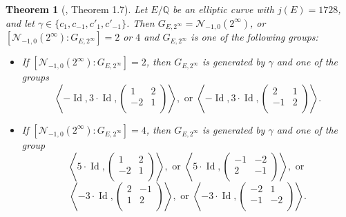 \documentclass[11pt]{amsart}
\newtheorem{thm}[defn]{Theorem}
\theoremstyle{definition}
\newcommand{\Q}{\mathbb{Q}}
\begin{document}
\begin{thm}[\cite{lozano-galoiscm}, Theorem 1.7]\label{thm-j1728alvaro}\label{thm-lastofsec1}
	Let $E/\Q$ be an elliptic curve with $j(E)=1728$, and let $\gamma \in \{ c_{1}, c_{-1}, c'_{1}, c'_{-1} \}$. Then $G_{E,2^\infty} = \mathcal{N}_{-1,0}(2^\infty)$, or $[\mathcal{N}_{-1,0}(2^\infty) : G_{E,2^\infty}] = 2$ or $4$ and $G_{E,2^\infty}$ is one of the following groups:
	\begin{itemize} 
		\item If $[\mathcal{N}_{-1,0}(2^\infty):G_{E,2^\infty}]=2$, then $G_{E,2^\infty}$ is generated by $\gamma$ and one of the groups
		\[ \left\langle -\operatorname{Id}, 3\cdot \operatorname{Id},\left(\begin{array}{cc} 1 & 2\\ -2 & 1\\\end{array}\right) \right\rangle, \text{ or } \left\langle -\operatorname{Id}, 3\cdot \operatorname{Id},\left(\begin{array}{cc} 2 & 1\\ -1 & 2\\\end{array}\right) \right\rangle. \]
		\item If $[\mathcal{N}_{-1,0}(2^\infty) : G_{E,2^\infty}]=4$, then $G_{E,2^\infty}$ is generated by $\gamma$ and one of the group
		\[ \left\langle 5\cdot \operatorname{Id},\left(\begin{array}{cc} 1 & 2\\ -2 & 1\\\end{array}\right) \right\rangle, \text{ or } \left\langle 5\cdot \operatorname{Id},\left(\begin{array}{cc} -1 & -2\\ 2 & -1\\\end{array}\right) \right\rangle, \text{ or } \]
		\[  \left\langle -3\cdot \operatorname{Id},\left(\begin{array}{cc} 2 & -1\\ 1 & 2\\\end{array}\right) \right\rangle, \text{ or } \left\langle -3\cdot \operatorname{Id},\left(\begin{array}{cc} -2 & 1\\ -1 & -2\\\end{array}\right) \right\rangle. \]
\end{itemize}
\end{thm}
\end{document}
